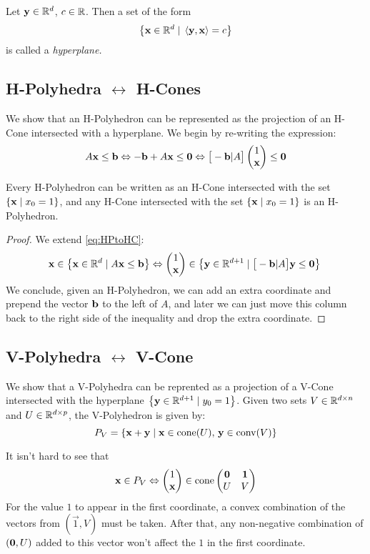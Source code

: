 \begin{Def}[Hyperplane]
	Let $\mathbf{y} \in \mathbb{R}^d$, $c \in \mathbb{R}$.  Then a set of the form
	\[ \left\{\mathbf{x} \in \mathbb{R}^d \;|\; \left\langle \mathbf{y}, \mathbf{x} \right\rangle = c\right\} \]
	is called a \em{hyperplane}.
\end{Def}

\subsection{H-Polyhedra $\leftrightarrow$ H-Cones}
We show that an H-Polyhedron can be represented as the projection of an H-Cone intersected with a hyperplane.  We begin by re-writing the expression:
\begin{equation}\label{eq:HPtoHC}
	A\x \leq \b \Leftrightarrow -\b + A\x \leq \0 \Leftrightarrow
	\big[-\b|A\big]\onex \leq \0
\end{equation}

\begin{Prop}
	Every H-Polyhedron can be written as an H-Cone intersected with the set $\left\{\mathbf{x}\;|\; x_0 = 1\right\}$, and any H-Cone intersected with the set $\left\{\mathbf{x}\;|\; x_0 = 1\right\}$ is an H-Polyhedron.
\end{Prop}
\begin{proof}
	We extend \eqref{eq:HPtoHC}:
	\[ \x \in \set{\xv \st A\x \leq \b} \Leftrightarrow
		\onex \in \set{\yv \st \big[-\b|A\big]\y \leq \0}\\
	\]
	We conclude, given an H-Polyhedron, we can add an extra coordinate and prepend the vector $\mathbf{b}$ to the left of $A$, and later we can just move this column back to the right side of the inequality and drop the extra coordinate.
\end{proof}

\subsection{V-Polyhedra $\leftrightarrow$ V-Cone}

We show that a V-Polyhedra can be reprented as a projection of a V-Cone intersected with the hyperplane $\left\{\mathbf{y} \in \mathbb{R}^{d+1} \;|\; y_0 = 1\right\}$.  Given two sets $V \in \mathbb{R}^{d\times n}$ and $U \in \mathbb{R}^{d\times p}$, the V-Polyhedron is given by:
\[ P_V = \left\{\mathbf{x} + \mathbf{y} \;|\; \mathbf{x} \in \operatorname{cone}(U),\, \mathbf{y} \in \operatorname{conv}(V)\right\} \]

It isn't hard to see that
\[ \x \in P_V \Leftrightarrow \onex \in \cone\lcone \]
For the value $1$ to appear in the first coordinate, a convex combination of the vectors from $(\vec{1}, V)$ must be taken.  After that, any non-negative combination of $(\mathbf{0},U)$ added to this vector won't affect the $1$ in the first coordinate.

